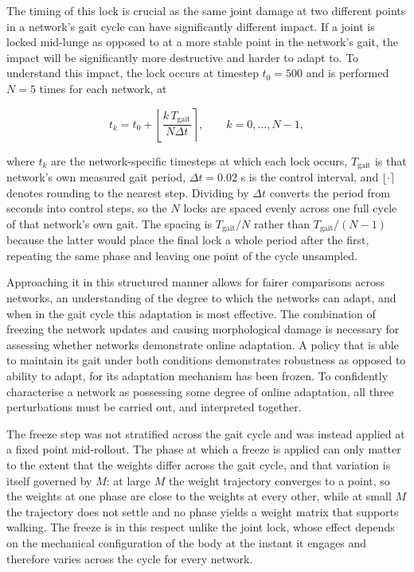 \documentclass{article} %
\begin{document}
The timing of this lock is crucial as the same joint damage at two different points in a network's gait cycle can have significantly different impact. If a joint is locked mid-lunge as opposed to at a more stable point in the network's gait, the impact will be significantly more destructive and harder to adapt to. To understand this impact, the lock occurs at timestep $t_0 = 500$ and is performed $N = 5$ times for each network, at

\begin{equation}
t_k = t_0 + \left\lfloor \frac{k\,T_{\text{gait}}}{N \Delta t} \right\rceil,
\qquad k = 0, \dots, N-1,
\label{eq:ablation-strata}
\end{equation}

where $t_k$ are the network-specific timesteps at which each lock occurs, $T_{\text{gait}}$ is that network's own measured gait period, $\Delta t = 0.02$ s is the control interval, and $\lfloor \cdot \rceil$ denotes rounding to the nearest step. Dividing by $\Delta t$ converts the period from seconds into control steps, so the $N$ locks are spaced evenly across one full cycle of that network's own gait. The spacing is $T_{\text{gait}}/N$ rather than $T_{\text{gait}}/(N-1)$ because the latter would place the final lock a whole period after the first, repeating the same phase and leaving one point of the cycle unsampled. 

Approaching it in this structured manner allows for fairer comparisons across networks, an understanding of the degree to which the networks can adapt, and when in the gait cycle this adaptation is most effective. The combination of freezing the network updates and causing morphological damage is necessary for assessing whether networks demonstrate online adaptation. A policy that is able to maintain its gait under both conditions demonstrates robustness as opposed to ability to adapt, for its adaptation mechanism has been frozen. To confidently characterise a network as possessing some degree of online adaptation, all three perturbations must be carried out, and interpreted together.

The freeze step was not stratified across the gait cycle and was instead applied at a fixed point mid-rollout. The phase at which a freeze is applied can only matter to the extent that the weights differ across the gait cycle, and that variation is itself governed by $M$: at large $M$ the weight trajectory converges to a point, so the weights at one phase are close to the weights at every other, while at small $M$ the trajectory does not settle and no phase yields a weight matrix that supports walking. The freeze is in this respect unlike the joint lock, whose effect depends on the mechanical configuration of the body at the instant it engages and therefore varies across the cycle for every network.
\end{document}
